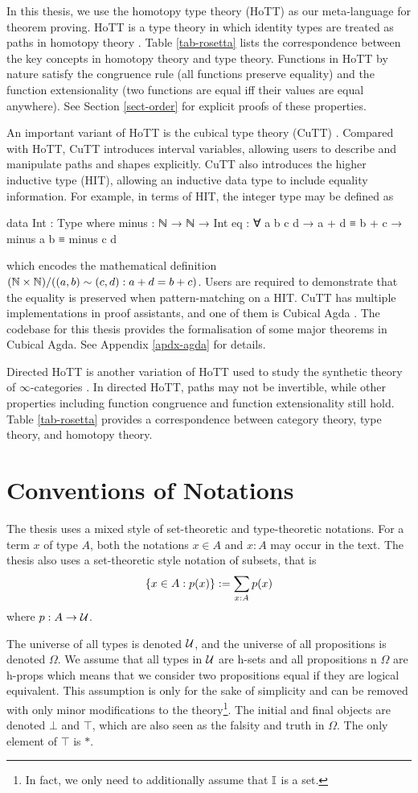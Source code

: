 In this thesis, we use the homotopy type theory (HoTT) as our meta-language for theorem proving. HoTT is a type theory in which identity types are treated as paths in homotopy theory \cite{the_univalent_foundations_program_homotopy_2013}. Table \ref{tab-rosetta} lists the correspondence between the key concepts in homotopy theory and type theory. Functions in HoTT by nature satisfy the congruence rule (all functions preserve equality) and the function extensionality (two functions are equal iff their values are equal anywhere). See Section \ref{sect-order} for explicit proofs of these properties.

An important variant of HoTT is the cubical type theory (CuTT) \cite{cohen_cubical_2018}. Compared with HoTT, CuTT introduces interval variables, allowing users to describe and manipulate paths and shapes explicitly. CuTT also introduces the higher inductive type (HIT), allowing an inductive data type to include equality information. For example, in terms of HIT, the integer type may be defined as
\begin{code}
data Int : Type where
    minus : ℕ → ℕ → Int
    eq : ∀ a b c d → a + d ≡ b + c → minus a b ≡ minus c d
\end{code}
which encodes the mathematical definition $(\mathbb{N}\times\mathbb{N})/((a,b)\sim(c,d):a+d=b+c)$. Users are required to demonstrate that the equality is preserved when pattern-matching on a HIT. CuTT has multiple implementations in proof assistants, and one of them is Cubical Agda \cite{vezzosi_cubical_2019}. The codebase for this thesis provides the formalisation of some major theorems in Cubical Agda. See Appendix \ref{apdx-agda} for details.

Directed HoTT is another variation of HoTT used to study the synthetic theory of $\infty$-categories \cite{riehl_type_2023}. In directed HoTT, paths may not be invertible, while other properties including function congruence and function extensionality still hold. Table \ref{tab-rosetta} provides a correspondence between category theory, type theory, and homotopy theory.

\section{Conventions of Notations}
The thesis uses a mixed style of set-theoretic and type-theoretic notations. For a term $x$ of type $A$, both the notations $x\in A$ and $x:A$ may occur in the text. The thesis also uses a set-theoretic style notation of subsets, that is
$$\left\{x\in A:p(x)\right\}:=\sum_{x:A}p(x)$$
where $p:A\to\mathcal{U}$.

The universe of all types is denoted $\mathcal{U}$, and the universe of all propositions is denoted $\Omega$. We assume that all types in $\mathcal{U}$ are h-sets and all propositions n $\Omega$ are h-props which means that we consider two propositions equal if they are logical equivalent. This assumption is only for the sake of simplicity and can be removed with only minor modifications to the theory\footnote{In fact, we only need to additionally assume that $\mathbb{I}$ is a set.}. The initial and final objects are denoted $\bot$ and $\top$, which are also seen as the falsity and truth in $\Omega$. The only element of $\top$ is $*$.

